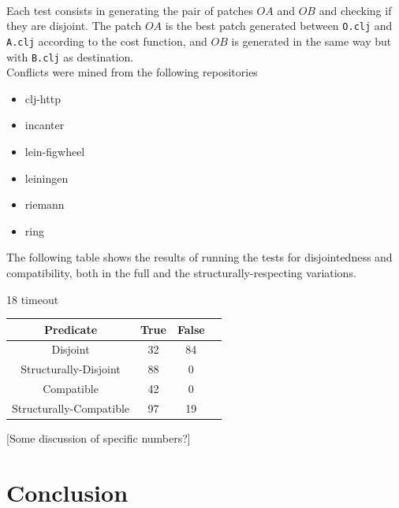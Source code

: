 \documentclass[11pt, titlepage]{article}
\newcommand{\toHaskell}[1]{\texttt{#1}\xspace}
\begin{document}
\\
Each test consists in generating the pair of patches $OA$ and $OB$ and checking if they are disjoint. 
The patch $OA$ is the best patch generated between \texttt{O.clj} and \texttt{A.clj} according to the cost function, and $OB$ is generated in the same way but with \toHaskell{B.clj} as destination.
\\
Conflicts were mined from the following repositories
 \begin{itemize}
    \item clj-http
    \item incanter
    \item lein-figwheel
    \item leiningen
    \item riemann
    \item ring
 \end{itemize}

The following table shows the results of running the tests for disjointedness and compatibility, both in the full and the structurally-respecting variations. 

18 timeout
\\
\begin{center}
 \begin{tabular} { ||c|c|c|c|| }
   \hline Predicate & True & False  \\
   \hline
   \hline Disjoint & 32 & 84 \\
   \hline Structurally-Disjoint & 88 & 0 \\
   \hline Compatible & 42 & 0 \\
   \hline Structurally-Compatible & 97 & 19 \\
   \hline
 \end{tabular}
\end{center}

[Some discussion of specific numbers?]
\section{Conclusion}
\end{document}
